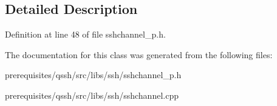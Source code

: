 \subsection{Detailed Description}


Definition at line 48 of file sshchannel\+\_\+p.\+h.



The documentation for this class was generated from the following files\+:\begin{DoxyCompactItemize}
\item 
prerequisites/qssh/src/libs/ssh/sshchannel\+\_\+p.\+h\item 
prerequisites/qssh/src/libs/ssh/sshchannel.\+cpp\end{DoxyCompactItemize}
